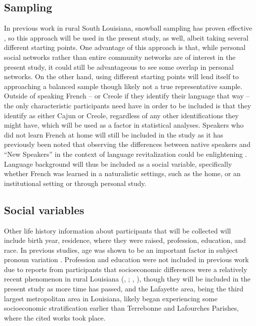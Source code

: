 \documentclass{article}\usepackage[]{graphicx}\usepackage[]{xcolor}
\begin{document}
    \subsection{Sampling}
      In previous work in rural South Louisiana, snowball sampling has proven effective \parencite{brown_pronominal_1988, giancarlo_dont_2019, rottet_language_1995}, so this approach will be used in the present study, as well, albeit taking several different starting points.
      One advantage of this approach is that, while personal social networks rather than entire community networks are of interest in the present study, it could still be advantageous to see some overlap in personal networks.
      On the other hand, using different starting points will lend itself to approaching a balanced sample though likely not a true representative sample.
      Outside of speaking French -- or Creole if they identify their language that way -- the only characteristic participants need have in order to be included is that they identify as either Cajun or Creole, regardless of any other identifications they might have, which will be used as a factor in statistical analyses.
      Speakers who did not learn French at home will still be included in the study as it has previously been noted that observing the differences between native speakers and ``New Speakers'' in the context of language revitalization could be enlightening \parencite[p.~21]{gudmestad_variationist_2022}.
      Language background will thus be included as a social variable, specifically whether French was learned in a naturalistic settings, such as the home, or an institutional setting or through personal study.

    \subsection{Social variables}
      Other life history information about participants that will be collected will include birth year, residence, where they were raised, profession, education, and race.
      In previous studies, age was shown to be an important factor in subject pronoun variation \parencite{rottet_language_1995}.
      Profession and education were not included in previous work due to reports from participants that socioeconomic differences were a relatively recent phenomenon in rural Louisiana (\citeauthor{dajko_ethnic_2009}, \citeyear[p.~66]{dajko_ethnic_2009}; \citeauthor{rottet_language_1995}, \citeyear[p.~64]{rottet_language_1995}), though they will be included in the present study as more time has passed, and the Lafayette area, being the third largest metropolitan area in Louisiana, likely began experiencing some socioeconomic stratification earlier than Terrebonne and Lafourches Parishes, where the cited works took place.
\end{document}
